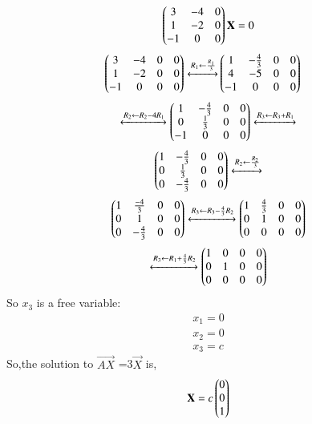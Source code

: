 \documentclass[journal,12pt,twocolumn]{IEEEtran}
\begin{document}
\begin{align}
\begin{pmatrix}3&-4&0\\
1&-2&0\\
-1&0&0
\end{pmatrix}\mathbf X=0
\end{align} 
\begin{align}
\begin{pmatrix}3& -4&0&0\\
1 & -2 & 0&0\\
-1 & 0 &0&0
\end{pmatrix}
\xleftrightarrow[]{R_1 \leftarrow \frac{R_1}{3} } 
&
\begin{pmatrix}1&-\frac{4}{3}&0&0\\
4&-5&0&0\\
-1&0&0&0\end{pmatrix}\nonumber 
\end{align}
\begin{align}
\xleftrightarrow[]{R_2 \leftarrow R_2-4R_1} 
    \begin{pmatrix}1&-\frac{4}{3}&0&0\\
            0&\frac{1}{3}&0&0\\
            -1&0&0&0\end{pmatrix}
    \xleftrightarrow[]{R_3 \leftarrow R_3+R_1 }
\end{align}
\begin{align}
    \begin{pmatrix}1&-\frac{4}{3}&0&0\\
            0&\frac{1}{3}&0&0\\
            0&-\frac{4}{3}&0&0\end{pmatrix}
     \xleftrightarrow[]{R_2 \leftarrow\frac{R_2}{3} }\nonumber
\end{align}
\begin{align}
    \begin{pmatrix}1&\frac{-4}{3}&0&0\\
    0&1&0&0\\
    0&-\frac{4}{3}&0&0\end{pmatrix}
    \xleftrightarrow[]{R_3 \leftarrow R_3-\frac{4}{3}R_2} 
    \begin{pmatrix}1&\frac{4}{3}&0&0\\
           0&1&0&0\\
         0&0&0&0\end{pmatrix}   
    \nonumber
\end{align}
\begin{align} \label{eq:eq_15}
 \xleftrightarrow[]{R_3 \leftarrow R_1+\frac{4}{3}R_2}
    \begin{pmatrix}1&0&0&0\\
    0&1&0&0\\
    0&0&0&0\end{pmatrix} 
\end{align}
So $x_3$ is a free variable:
\begin{align}
  x_1=0\\
  x_2=0\\
  x_3=c
\end{align}
 So,the solution to $\vec {AX}$ =3$\vec{X}$ is,
 \begin{align}\label{eq:222}
 \mathbf{X} =
 c
 \begin{pmatrix}
 0\\0\\1
 \end{pmatrix}
 \end{align}
\end{document}
